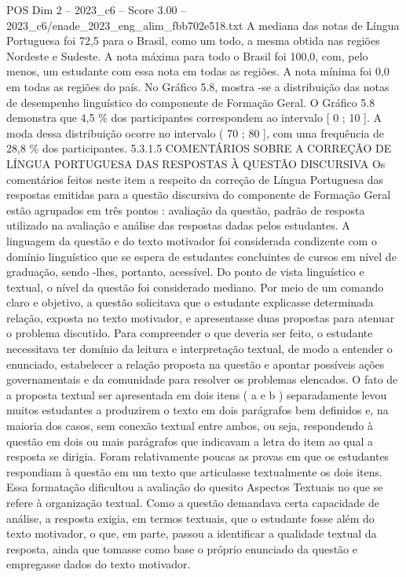 \begin{textsample}{POS Dim 2 – 2023\_c6 – Score 3.00 – 2023\_c6/enade\_2023\_eng\_alim\_fbb702e518.txt}
A mediana das notas de Língua Portuguesa foi 72,5 para o Brasil, como um todo, a mesma obtida nas regiões Nordeste e Sudeste.
A nota máxima para todo o Brasil foi 100,0, com, pelo menos, um estudante com essa nota em todas as regiões.
A nota mínima foi 0,0 em todas as regiões do país.
No Gráfico 5.8, mostra -se a distribuição das notas de desempenho linguístico do componente de Formação Geral.
O Gráfico 5.8 demonstra que 4,5 \% dos participantes correspondem ao intervalo [ 0 ; 10 ].
A moda dessa distribuição ocorre no intervalo ( 70 ; 80 ], com uma frequência de 28,8 \% dos participantes. 5.3.1.5 COMENTÁRIOS SOBRE A CORREÇÃO DE LÍNGUA PORTUGUESA DAS RESPOSTAS À QUESTÃO DISCURSIVA Os comentários feitos neste item a respeito da correção de Língua Portuguesa das respostas emitidas para a questão discursiva do componente de Formação Geral estão agrupados em três pontos : avaliação da questão, padrão de resposta utilizado na avaliação e análise das respostas dadas pelos estudantes.
A linguagem da questão e do texto motivador foi considerada condizente com o domínio linguístico que se espera de estudantes concluintes de cursos em nível de graduação, sendo -lhes, portanto, acessível.
Do ponto de vista linguístico e textual, o nível da questão foi considerado mediano.
Por meio de um comando claro e objetivo, a questão solicitava que o estudante explicasse determinada relação, exposta no texto motivador, e apresentasse duas propostas para atenuar o problema discutido.
Para compreender o que deveria ser feito, o estudante necessitava ter domínio da leitura e interpretação textual, de modo a entender o enunciado, estabelecer a relação proposta na questão e apontar possíveis ações governamentais e da comunidade para resolver os problemas elencados.
O fato de a proposta textual ser apresentada em dois itens ( a e b ) separadamente levou muitos estudantes a produzirem o texto em dois parágrafos bem definidos e, na maioria dos casos, sem conexão textual entre ambos, ou seja, respondendo à questão em dois ou mais parágrafos que indicavam a letra do item ao qual a resposta se dirigia.
Foram relativamente poucas as provas em que os estudantes respondiam à questão em um texto que articulasse textualmente os dois itens.
Essa formatação dificultou a avaliação do quesito Aspectos Textuais no que se refere à organização textual.
Como a questão demandava certa capacidade de análise, a resposta exigia, em termos textuais, que o estudante fosse além do texto motivador, o que, em parte, passou a identificar a qualidade textual da resposta, ainda que tomasse como base o próprio enunciado da questão e empregasse dados do texto motivador.

\end{textsample}
